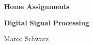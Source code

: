 \documentclass{article}
\begin{document}
\textbf{\Large Home Assignments}
\vspace{0.2cm}

\textbf{\large Digital Signal Processing}
\vspace{0.5cm}

{\large Marco Schwarz}




\end{document}
